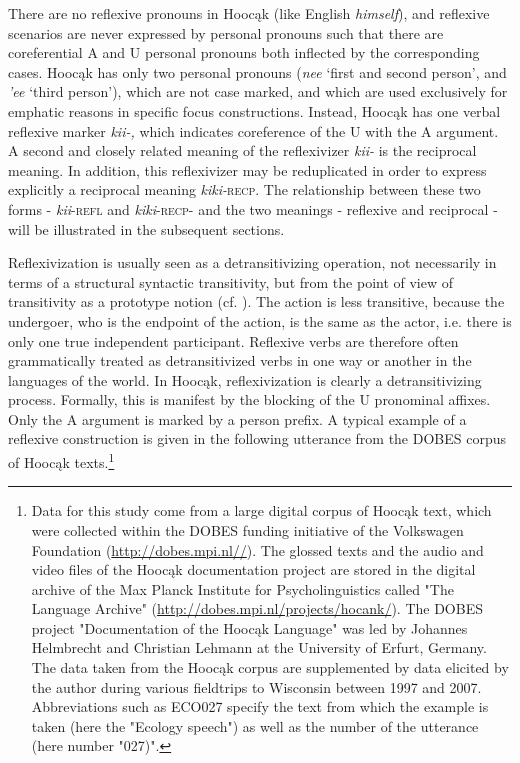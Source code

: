 \documentclass[output=paper]{langscibook}
\begin{document}
There are no reflexive pronouns in Hoocąk (like English \textit{himself}), and reflexive scenarios are never expressed by personal pronouns such that there are coreferential A and U personal pronouns both inflected by the corresponding cases. Hoocąk has only two personal pronouns (\textit{nee} `first and second person', and \textit{{}'ee} `third person'), which are not case marked, and which are used exclusively for emphatic reasons in specific focus constructions. Instead, Hoocąk has one verbal reflexive marker \textit{kii-,} which indicates coreference of the U with the A argument. A second and closely related meaning of the reflexivizer \textit{kii-} is the reciprocal meaning. In addition, this reflexivizer may be reduplicated in order to express explicitly a reciprocal meaning \textit{kiki-}\textsc{recp}. The relationship between these two forms - \textit{kii}\textsc{-refl} and \textit{kiki}\textsc{-recp-} and the two meanings - reflexive and reciprocal - will be illustrated in the subsequent sections.  

Reflexivization is usually seen as a detransitivizing operation, not necessarily in terms of a structural syntactic transitivity, but from the point of view of transitivity as a prototype notion (cf. \citealt{HopperThompson1980}). The action is less transitive, because the undergoer, who is the endpoint of the action, is the same as the actor, i.e. there is only one true independent participant. Reflexive verbs are therefore often grammatically treated as detransitivized verbs in one way or another in the languages of the world. In Hoocąk, reflexivization is clearly a detransitivizing process. Formally, this is manifest by the blocking of the U pronominal affixes. Only the A argument is marked by a person prefix. A typical example of a reflexive construction is given in the following utterance from the DOBES corpus of Hoocąk texts.\footnote{Data for this study come from a large digital corpus of Hoocąk text, which were collected within the DOBES funding initiative of the Volkswagen Foundation (\url{http://dobes.mpi.nl//}). The glossed texts and the audio and video files of the Hoocąk documentation project are stored in the digital archive of the Max Planck Institute for Psycholinguistics called "The Language Archive" (\url{http://dobes.mpi.nl/projects/hocank/}). The DOBES project "Documentation of the Hoocąk Language" was led by Johannes Helmbrecht and Christian Lehmann at the University of Erfurt, Germany. The data taken from the Hoocąk corpus are supplemented by data elicited by the author during various fieldtrips to Wisconsin between 1997 and 2007. Abbreviations such as ECO027 specify the text from which the example is taken (here the "Ecology speech") as well as the number of the utterance (here number "027)".} 
\end{document}

